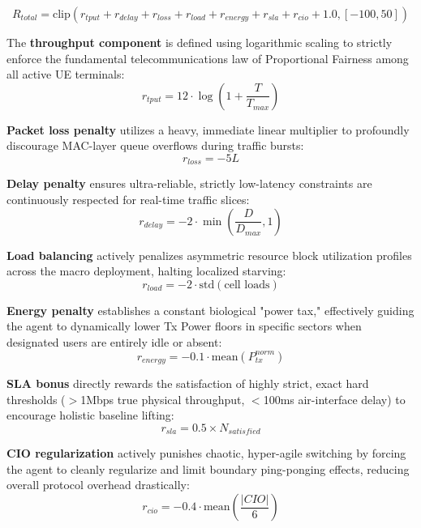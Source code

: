 \documentclass[12pt,a4paper]{article}
\begin{document}
\begin{equation}
R_{total} = \text{clip}(r_{tput} + r_{delay} + r_{loss} + r_{load} + r_{energy} + r_{sla} + r_{cio} + 1.0, [-100, 50])
\end{equation}

The \textbf{throughput component} is defined using logarithmic scaling to strictly enforce the fundamental telecommunications law of Proportional Fairness among all active UE terminals:
\begin{equation}
r_{tput} = 12 \cdot \log\left(1 + \frac{T}{T_{max}}\right)
\end{equation}

\textbf{Packet loss penalty} utilizes a heavy, immediate linear multiplier to profoundly discourage MAC-layer queue overflows during traffic bursts:
\begin{equation}
r_{loss} = -5L
\end{equation}

\textbf{Delay penalty} ensures ultra-reliable, strictly low-latency constraints are continuously respected for real-time traffic slices:
\begin{equation}
r_{delay} = -2 \cdot \min\left(\frac{D}{D_{max}}, 1\right)
\end{equation}

\textbf{Load balancing} actively penalizes asymmetric resource block utilization profiles across the macro deployment, halting localized starving:
\begin{equation}
r_{load} = -2 \cdot \text{std}(\text{cell loads})
\end{equation}

\textbf{Energy penalty} establishes a constant biological "power tax," effectively guiding the agent to dynamically lower Tx Power floors in specific sectors when designated users are entirely idle or absent:
\begin{equation}
r_{energy} = -0.1 \cdot \text{mean}(P_{tx}^{norm})
\end{equation}

\textbf{SLA bonus} directly rewards the satisfaction of highly strict, exact hard thresholds ($>$1Mbps true physical throughput, $<$100ms air-interface delay) to encourage holistic baseline lifting:
\begin{equation}
r_{sla} = 0.5 \times N_{satisfied}
\end{equation}

\textbf{CIO regularization} actively punishes chaotic, hyper-agile switching by forcing the agent to cleanly regularize and limit boundary ping-ponging effects, reducing overall protocol overhead drastically:
\begin{equation}
r_{cio} = -0.4 \cdot \text{mean}\left(\frac{|CIO|}{6}\right)
\end{equation}
\end{document}
